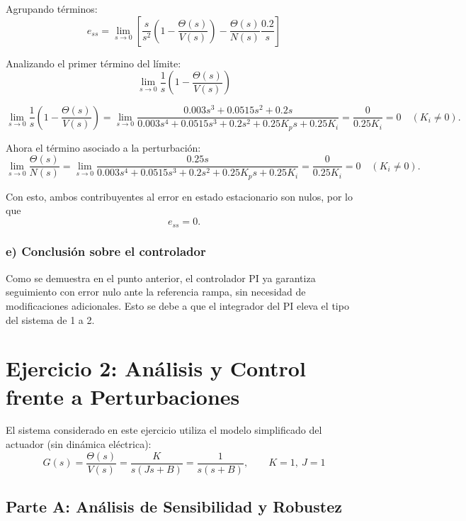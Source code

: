\documentclass[12pt,a4paper]{article}
\begin{document}
Agrupando términos:
\[
  e_{ss}=\lim_{s\to 0}\left[\frac{s}{s^2}\left(1-\frac{\Theta(s)}{V(s)}\right) - \frac{\Theta(s)}{N(s)}\frac{0.2}{s}\right]
\]

Analizando el primer término del límite:
\[
  \lim_{s\to 0}\frac{1}{s}\left(1-\frac{\Theta(s)}{V(s)}\right)
\]

\[
  \lim_{s\to 0}\frac{1}{s}\left(1-\frac{\Theta(s)}{V(s)}\right)
  = \lim_{s\to 0}\frac{0.003s^3 + 0.0515s^2 + 0.2s}{0.003s^4 + 0.0515s^3 + 0.2s^2 + 0.25K_p s + 0.25K_i} =\frac{0}{0.25K_i}=0 \quad (K_i\neq 0).
\]

Ahora el término asociado a la perturbación:
\[
  \lim_{s\to 0}\frac{\Theta(s)}{N(s)}=\lim_{s\to 0}\frac{0.25s}{0.003s^4 + 0.0515s^3 + 0.2s^2 + 0.25K_p s + 0.25K_i}
  =\frac{0}{0.25K_i}=0 \quad (K_i\neq 0).
\]

Con esto, ambos contribuyentes al error en estado estacionario son nulos, por lo que
\[
  e_{ss}=0.
\]


\subsubsection*{e) Conclusión sobre el controlador}

Como se demuestra en el punto anterior, el controlador PI ya garantiza seguimiento con error nulo ante la referencia rampa, sin necesidad de modificaciones adicionales. Esto se debe a que el integrador del PI eleva el tipo del sistema de 1 a 2.

\newpage
\section{Ejercicio 2: Análisis y Control frente a Perturbaciones}

El sistema considerado en este ejercicio utiliza el modelo simplificado del actuador (sin dinámica eléctrica):
\[
  G(s) = \frac{\Theta(s)}{V(s)} = \frac{K}{s(Js+B)} = \frac{1}{s(s+B)}, \qquad K=1,\ J=1
\]

\subsection{Parte A: Análisis de Sensibilidad y Robustez}

\end{document}
